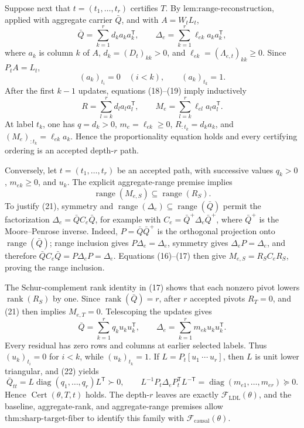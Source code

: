 Suppose next that \(t=(t_1,\ldots,t_r)\) certifies \(T\).  By \(\text{lem:range-reconstruction}\), applied with aggregate carrier \(\bar Q\), and with \(A=W_tL_t\),
\[
 \bar Q=\sum_{k=1}^r d_ka_ka_k^{\mathsf T},
 \qquad
 \Delta_e=\sum_{k=1}^r \ell_{ek}a_ka_k^{\mathsf T}, \tag{18}
\]
where \(a_k\) is column \(k\) of \(A\), \(d_k=(D_t)_{kk}>0\), and \(\ell_{ek}=(\Lambda_{e,t})_{kk}\ge0\).  Since \(P_tA=L_t\),
\[
 (a_k)_{t_i}=0\quad(i<k),\qquad (a_k)_{t_k}=1. \tag{19}
\]
After the first \(k-1\) updates, equations (18)--(19) imply inductively
\[
 R=\sum_{l=k}^r d_la_la_l^{\mathsf T},
 \qquad M_e=\sum_{l=k}^r\ell_{el}a_la_l^{\mathsf T}. \tag{20}
\]
At label \(t_k\), one has \(q=d_k>0\), \(m_e=\ell_{ek}\ge0\), \(R_{:t_k}=d_ka_k\), and \((M_e)_{:t_k}=\ell_{ek}a_k\).  Hence the proportionality equation holds and every certifying ordering is an accepted depth-\(r\) path.

Conversely, let \(t=(t_1,\ldots,t_r)\) be an accepted path, with successive values \(q_k>0\), \(m_{ek}\ge0\), and \(u_k\).  The explicit aggregate-range premise implies
\[
 \operatorname{range}(M_{e,S})\subseteq\operatorname{range}(R_S). \tag{21}
\]
To justify (21), symmetry and \(\operatorname{range}(\Delta_e)\subseteq\operatorname{range}(\bar Q)\) permit the factorization
\(\Delta_e=\bar Q C_e\bar Q\), for example with
\(C_e=\bar Q^{+}\Delta_e\bar Q^{+}\), where \(\bar Q^{+}\) is the Moore--Penrose inverse.  Indeed, \(P=\bar Q\bar Q^{+}\) is the orthogonal projection onto \(\operatorname{range}(\bar Q)\); range inclusion gives \(P\Delta_e=\Delta_e\), symmetry gives \(\Delta_eP=\Delta_e\), and therefore \(\bar QC_e\bar Q=P\Delta_eP=\Delta_e\).  Equations (16)--(17) then give
\(M_{e,S}=R_SC_eR_S\), proving the range inclusion.

The Schur-complement rank identity in (17) shows that each nonzero pivot lowers \(\operatorname{rank}(R_S)\) by one.  Since \(\operatorname{rank}(\bar Q)=r\), after \(r\) accepted pivots \(R_T=0\), and (21) then implies \(M_{e,T}=0\).  Telescoping the updates gives
\[
 \bar Q=\sum_{k=1}^r q_ku_ku_k^{\mathsf T},
 \qquad
 \Delta_e=\sum_{k=1}^r m_{ek}u_ku_k^{\mathsf T}. \tag{22}
\]
Every residual has zero rows and columns at earlier selected labels.  Thus \((u_k)_{t_i}=0\) for \(i<k\), while \((u_k)_{t_k}=1\).  If
\(L=P_t[u_1\ \cdots\ u_r]\), then \(L\) is unit lower triangular, and (22) yields
\[
 \bar Q_{tt}=L\operatorname{diag}(q_1,\ldots,q_r)L^{\mathsf T}\succ0,
 \qquad
 L^{-1}P_t\Delta_eP_t^{\mathsf T}L^{-\mathsf T}
 =\operatorname{diag}(m_{e1},\ldots,m_{er})\succeq0. \tag{23}
\]
Hence \(\operatorname{Cert}(\theta,T,t)\) holds.  The depth-\(r\) leaves are exactly \(\mathcal F_{\mathrm{LDL}}(\theta)\), and the baseline, aggregate-rank, and aggregate-range premises allow \(\text{thm:sharp-target-fiber}\) to identify this family with \(\mathcal F_{\mathrm{causal}}(\theta)\).

